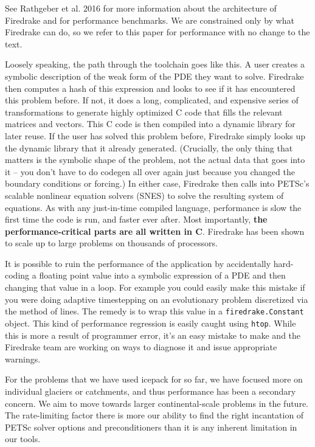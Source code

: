 \documentclass{article}
\theoremstyle{definition}
\theoremstyle{plain}
\begin{document}
\begin{enumerate}
See Rathgeber et al. 2016 for more information about the architecture of Firedrake and for performance benchmarks.
We are constrained only by what Firedrake can do, so we refer to this paper for performance with no change to the text.

Loosely speaking, the path through the toolchain goes like this.
A user creates a symbolic description of the weak form of the PDE they want to solve.
Firedrake then computes a hash of this expression and looks to see if it has encountered this problem before.
If not, it does a long, complicated, and expensive series of transformations to generate highly optimized C code that fills the relevant matrices and vectors.
This C code is then compiled into a dynamic library for later reuse.
If the user has solved this problem before, Firedrake simply looks up the dynamic library that it already generated.
(Crucially, the only thing that matters is the symbolic shape of the problem, not the actual data that goes into it -- you don't have to do codegen all over again just because you changed the boundary conditions or forcing.)
In either case, Firedrake then calls into PETSc's scalable nonlinear equation solvers (SNES) to solve the resulting system of equations.
As with any just-in-time compiled language, performance is slow the first time the code is run, and faster ever after.
Most importantly, \textbf{the performance-critical parts are all written in C}.
Firedrake has been shown to scale up to large problems on thousands of processors.

It is possible to ruin the performance of the application by accidentally hard-coding a floating point value into a symbolic expression of a PDE and then changing that value in a loop.
For example you could easily make this mistake if you were doing adaptive timestepping on an evolutionary problem discretized via the method of lines.
The remedy is to wrap this value in a \texttt{firedrake.Constant} object.
This kind of performance regression is easily caught using \texttt{htop}.
While this is more a result of programmer error, it's an easy mistake to make and the Firedrake team are working on ways to diagnose it and issue appropriate warnings.

For the problems that we have used icepack for so far, we have focused more on individual glaciers or catchments, and thus performance has been a secondary concern.
We aim to move towards larger continental-scale problems in the future.
The rate-limiting factor there is more our ability to find the right incantation of PETSc solver options and preconditioners than it is any inherent limitation in our tools.


\end{enumerate}
\end{document}
